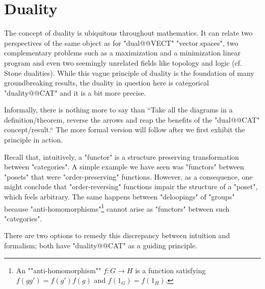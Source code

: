 \documentclass[main.tex]{subfiles}
\begin{document}
\chapter{Duality}\label{chap:duality}
The concept of duality is ubiquitous throughout mathematics. It can relate two perspectives of the same object as for "dual@@VECT" "vector spaces", two complementary problems such as a maximization and a minimization linear program and even two seemingly unrelated fields like topology and logic (cf. Stone dualities). While this vague principle of duality is the foundation of many groundbreaking results, the duality in question here is categorical "duality@@CAT" and it is a bit more precise.%

Informally, there is nothing more to say than ``Take all the diagrams in a definition/theorem, reverse the arrows and reap the benefits of the "dual@@CAT" concept/result.`` The more formal version will follow after we first exhibit the principle in action.

Recall that, intuitively, a "functor" is a structure preserving transformation between "categories". A simple example we have seen was "functors" between "posets" that were "order-preserving" functions. However, as a consequence, one might conclude that "order-reversing" functions impair the structure of a "poset", which feels arbitrary. The same happens between "deloopings" of "groups" because "anti-homomorphisms"\footnote{\AP An ""anti-homomorphism"" $f: G \rightarrow H$ is a function satisfying $f(gg') = f(g')f(g)$ and $f(1_G) = f(1_H)$.} cannot arise as "functors" between such "categories".

There are two options to remedy this discrepancy between intuition and formalism; both have "duality@@CAT" as a guiding principle.
\end{document}
